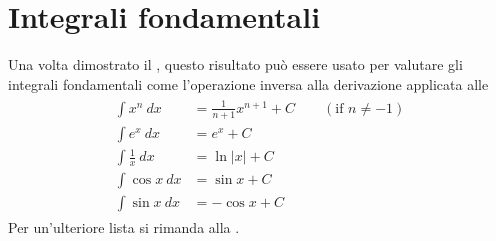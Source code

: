\documentclass[letterpaper,10pt,italian]{jupyterBook}
\begin{document}
\section{Integrali fondamentali}
\label{\detokenize{ch/infinitesimal_calculus/integrals:integrali-fondamentali}}\label{\detokenize{ch/infinitesimal_calculus/integrals:infinitesimal-calculus-integrals-fund}}
\sphinxAtStartPar
Una volta dimostrato il {\hyperref[\detokenize{ch/infinitesimal_calculus/integrals:infinitesimal-calculus-integrals-thm-fund}]{}}, questo risultato può essere usato per valutare gli integrali fondamentali come l’operazione inversa alla derivazione applicata alle {\hyperref[\detokenize{ch/infinitesimal_calculus/derivatives:infinitesimal-calculus-derivatives-fund}]{}}
\begin{equation*}
\begin{split}\begin{aligned}
 \int x^n         \ dx & = \frac{1}{n+1} x^{n+1} + C  \qquad (\text{if } n \neq -1) \\ 
 \int e^x         \ dx & = e^x                   + C \\ 
 \int \frac{1}{x} \ dx & = \ln | x |             + C \\ 
 \int \cos x      \ dx & = \sin x                + C \\ 
 \int \sin x      \ dx & =-\cos x                + C    
\end{aligned}\end{split}
\end{equation*}
\sphinxAtStartPar
Per un’ulteriore lista si rimanda alla {\hyperref[\detokenize{ch/infinitesimal_calculus/integrals-table:infinitesimal-calculus-integrals-table}]{}}.
\end{document}
